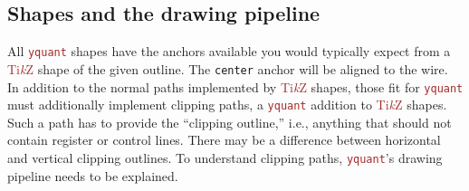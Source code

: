 \documentclass{scrartcl}
\def\TikZ{\textcolor{brown}{Ti\textit kZ}}
\def\pkg#1{\textcolor{brown}{\texttt{#1}}}
\def\Yquant{\pkg{yquant}}
\begin{document}
      \subsection{Shapes and the drawing pipeline}\label{sec:pipeline}
         All \Yquant{} shapes have the anchors available you would typically expect from a \TikZ{} shape of the given outline.
         The \texttt{center} anchor will be aligned to the wire.
         In addition to the normal paths implemented by \TikZ{} shapes, those fit for \Yquant{} must additionally implement clipping paths, a \Yquant{} addition to \TikZ{} shapes.
         Such a path has to provide the ``clipping outline,'' i.e., anything that should not contain register or control lines.
         There may be a difference between horizontal and vertical clipping outlines.
         To understand clipping paths, \Yquant's drawing pipeline needs to be explained.
\end{document}
